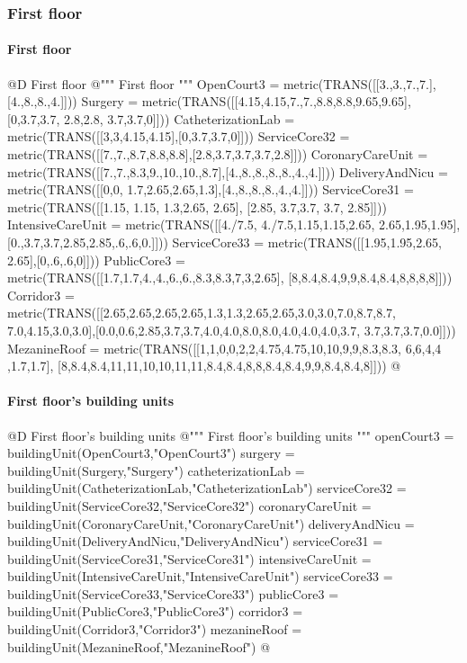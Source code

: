 \documentclass[11pt,oneside]{article}    %
\begin{document}
\subsubsection{First floor}
\paragraph{First floor}
@D First floor
@{""" First floor """
OpenCourt3 = metric(TRANS([[3.,3.,7.,7.],[4.,8.,8.,4.]]))
Surgery = metric(TRANS([[4.15,4.15,7.,7.,8.8,8.8,9.65,9.65],[0,3.7,3.7, 2.8,2.8, 3.7,3.7,0]]))
CatheterizationLab = metric(TRANS([[3,3,4.15,4.15],[0,3.7,3.7,0]]))
ServiceCore32 = metric(TRANS([[7.,7.,8.7,8.8,8.8],[2.8,3.7,3.7,3.7,2.8]]))
CoronaryCareUnit = metric(TRANS([[7.,7.,8.3,9.,10.,10.,8.7],[4.,8.,8.,8.,8.,4.,4.]]))
DeliveryAndNicu = metric(TRANS([[0,0, 1.7,2.65,2.65,1.3],[4.,8.,8.,8.,4.,4.]]))
ServiceCore31 = metric(TRANS([[1.15, 1.15, 1.3,2.65, 2.65], [2.85, 3.7,3.7, 3.7, 2.85]]))
IntensiveCareUnit = metric(TRANS([[4./7.5, 4./7.5,1.15,1.15,2.65, 2.65,1.95,1.95],
    [0.,3.7,3.7,2.85,2.85,.6,.6,0.]]))
ServiceCore33 = metric(TRANS([[1.95,1.95,2.65, 2.65],[0,.6,.6,0]]))
PublicCore3 = metric(TRANS([[1.7,1.7,4.,4.,6.,6.,8.3,8.3,7,3,2.65],
    [8,8.4,8.4,9,9,8.4,8.4,8,8,8,8]]))
Corridor3 = metric(TRANS([[2.65,2.65,2.65,2.65,1.3,1.3,2.65,2.65,3.0,3.0,7.0,8.7,8.7,
    7.0,4.15,3.0,3.0],[0.0,0.6,2.85,3.7,3.7,4.0,4.0,8.0,8.0,4.0,4.0,4.0,3.7,
    3.7,3.7,3.7,0.0]]))
MezanineRoof = metric(TRANS([[1,1,0,0,2,2,4.75,4.75,10,10,9,9,8.3,8.3, 6,6,4,4 ,1.7,1.7],
    [8,8.4,8.4,11,11,10,10,11,11,8.4,8.4,8,8,8.4,8.4,9,9,8.4,8.4,8]]))
@}

\paragraph{First floor's building units}
@D First floor's building units 
@{""" First floor's building units """
openCourt3 = buildingUnit(OpenCourt3,"OpenCourt3")
surgery = buildingUnit(Surgery,"Surgery")
catheterizationLab = buildingUnit(CatheterizationLab,"CatheterizationLab")
serviceCore32 = buildingUnit(ServiceCore32,"ServiceCore32")
coronaryCareUnit = buildingUnit(CoronaryCareUnit,"CoronaryCareUnit")
deliveryAndNicu = buildingUnit(DeliveryAndNicu,"DeliveryAndNicu")
serviceCore31 = buildingUnit(ServiceCore31,"ServiceCore31")
intensiveCareUnit = buildingUnit(IntensiveCareUnit,"IntensiveCareUnit")
serviceCore33 = buildingUnit(ServiceCore33,"ServiceCore33")
publicCore3 = buildingUnit(PublicCore3,"PublicCore3")
corridor3 = buildingUnit(Corridor3,"Corridor3")
mezanineRoof = buildingUnit(MezanineRoof,"MezanineRoof")
@}
\end{document}
